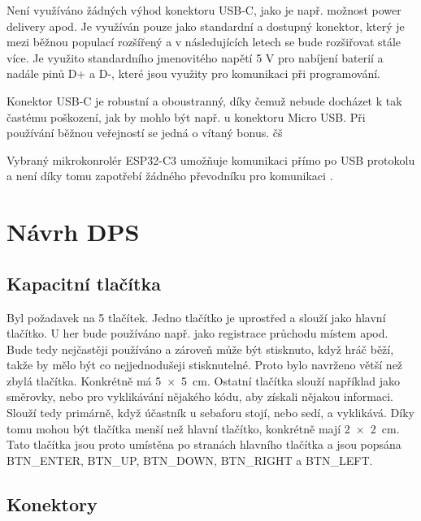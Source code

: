 Není využíváno žádných výhod konektoru USB-C, jako je např. možnost power delivery apod. Je využíván pouze jako standardní a dostupný konektor, který je mezi běžnou
populací rozšířený a v následujících letech se bude rozšiřovat stále více. Je využito standardního jmenovitého napětí 5 V pro nabíjení baterií a nadále pinů D+ a D-, 
které jsou využity pro komunikaci při programování. 

Konektor USB-C je robustní a oboustranný, díky čemuž nebude docházet k tak častému poškození, jak by mohlo být např. u konektoru Micro USB. Při používání běžnou veřejností
se jedná o vítaný bonus. čš

Vybraný mikrokonrolér ESP32-C3 umožňuje komunikaci přímo po USB protokolu a není díky tomu zapotřebí žádného převodníku pro komunikaci \cite{ESP_C3_dtsh}. %












\chapter{Návrh DPS}

\section{Kapacitní tlačítka} 
Byl požadavek na 5 tlačítek. Jedno tlačítko je uprostřed a slouží jako hlavní tlačítko. U her bude používáno např. jako registrace průchodu místem apod. Bude tedy nejčastěji
používáno a zároveň může být stisknuto, když hráč běží, takže by mělo být co nejjednodušeji stisknutelné. Proto bylo navrženo větší než zbylá tlačítka. Konkrétně má 
5~$\times$~5~cm. Ostatní tlačítka slouží například jako směrovky, nebo pro vyklikávání nějakého kódu, aby získali nějakou informaci. Slouží tedy primárně, když účastník 
u sebaforu stojí, nebo sedí, a vyklikává. Díky tomu mohou být tlačítka menší než hlavní tlačítko, konkrétně mají 2~$\times$~2~cm. Tato tlačítka jsou proto umístěna 
po stranách hlavního tlačítka a jsou popsána BTN\_ENTER, BTN\_UP, BTN\_DOWN, BTN\_RIGHT a BTN\_LEFT.

\section{Konektory}
